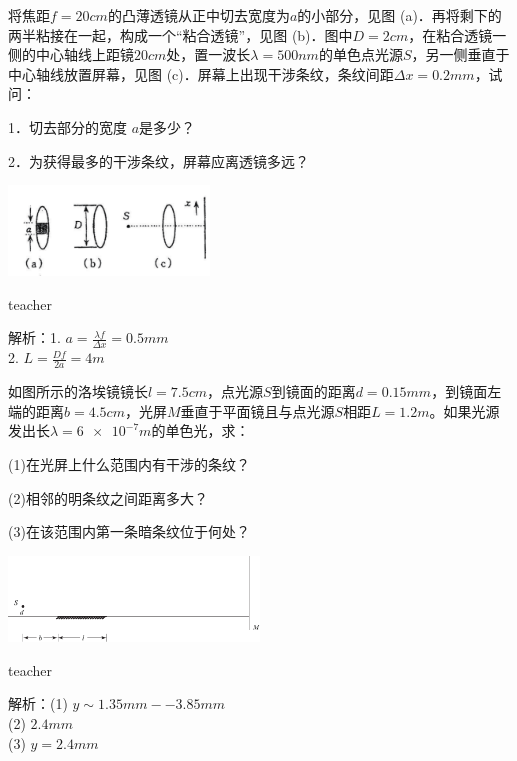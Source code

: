 \begin{example}
	将焦距$ f=20\si{cm}$的凸薄透镜从正中切去宽度为$ a $的小部分，见图 (a)．再将剩下的两半粘接在一起，构成一个“粘合透镜”，见图 (b)．图中$ D=2\si{cm}$，在粘合透镜一侧的中心轴线上距镜$ 20\si{cm}$处，置一波长$\lambda=500\si{nm}$的单色点光源$ S$，另一侧垂直于中心轴线放置屏幕，见图 (c)．屏幕上出现干涉条纹，条纹间距$\Delta x = 0.2\si{mm}$，试问：
	
	 1．切去部分的宽度 $a $是多少？
	 
	 2．为获得最多的干涉条纹，屏幕应离透镜多远？
	 		\begin{flushright}
	 			\includegraphics[width = 0.4\textwidth]{images/wave-optics-10.pdf} 
	 		\end{flushright}
	\begin{taggedblock}{teacher}
		
		解析：1. $a=\frac{\lambda f}{\Delta x}=0.5\si{mm}$\\
		2. $L= \frac{Df}{2a} = 4\si{m}$
	\end{taggedblock}
\end{example}%



\begin{example}
	如图所示的洛埃镜镜长$ l=7.5\si{cm}$，点光源$ S $到镜面的距离$ d=0.15\si{mm}$，到镜面左端的距离$b=4.5\si{cm}$，光屏$ M $垂直于平面镜且与点光源$ S $相距$ L=1.2\si{m}$。如果光源发出长$\lambda = \num{6e-7}\si{m}$的单色光，求：
	
	(1)在光屏上什么范围内有干涉的条纹？ 
	
	(2)相邻的明条纹之间距离多大？ 
	
	(3)在该范围内第一条暗条纹位于何处？
			\begin{flushright}
				\includegraphics[width = 0.5\textwidth]{images/wave-optics-9.pdf} 
			\end{flushright}
	\begin{taggedblock}{teacher}
		
		解析：(1) $y \sim 1.35\si{mm} -- 3.85\si{mm}$\\
		(2) $2.4mm$\\
		(3) $y=2.4mm$
	\end{taggedblock}
\end{example}%







